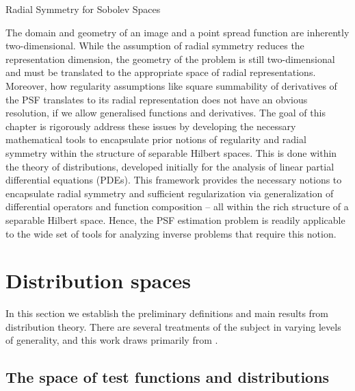 \setlength{\parindent}{2ex}
\begin{chapter}{Radial Symmetry for Sobolev Spaces}\label{chapter:theoretical}

The domain and geometry of an image and a point spread function are inherently two-dimensional. 
While the assumption of radial symmetry reduces the representation dimension, the geometry of the problem is still two-dimensional and must be translated to the appropriate space of radial representations. 
Moreover, how regularity assumptions like square summability of derivatives of the PSF translates to its radial representation does not have an obvious resolution, if we allow generalised functions and derivatives.
The goal of this chapter is rigorously address these issues by developing the necessary mathematical tools to encapsulate prior notions of regularity and radial symmetry within the structure of separable Hilbert spaces.
This is done within the theory of distributions, developed initially for the analysis of linear partial differential equations (PDEs). 
This framework provides the necessary notions to encapsulate radial symmetry and sufficient regularization via generalization of differential operators and function composition -- all within the rich structure of a separable Hilbert space.
Hence, the PSF estimation problem is readily applicable to the wide set of tools for analyzing inverse problems that require this notion.

\section{Distribution spaces}
In this section we establish the preliminary definitions and main results from distribution theory.
There are several treatments of the subject in varying levels of generality, and this work draws primarily from \citep{richtmyer1978principles,hormander1983,rudin1991,griffel2002,strichartz2003guide}.

  \subsection{The space of test functions and distributions}


\end{chapter}
